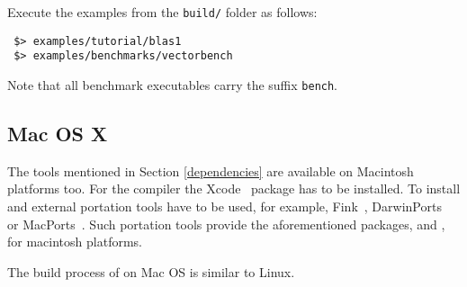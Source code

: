 
Execute the examples from the \lstinline|build/| folder as follows:
\begin{lstlisting}
 $> examples/tutorial/blas1
 $> examples/benchmarks/vectorbench
\end{lstlisting}
Note that all benchmark executables carry the suffix \lstinline|bench|.


\subsection{Mac OS X}
\label{apple}
The tools mentioned in Section \ref{dependencies} are available on
Macintosh platforms too.
For the {\GCC} compiler the Xcode~\cite{xcode} package has to be installed.
To install {\CMake} and {\Boost} external portation tools have to be used,
for example, Fink~\cite{fink}, DarwinPorts~\cite{darwinports}
or MacPorts~\cite{macports}. Such portation tools provide the
aforementioned packages, {\CMake} and {\Boost}, for macintosh platforms.


The build process of {\ViennaCL} on Mac OS is similar to Linux.

